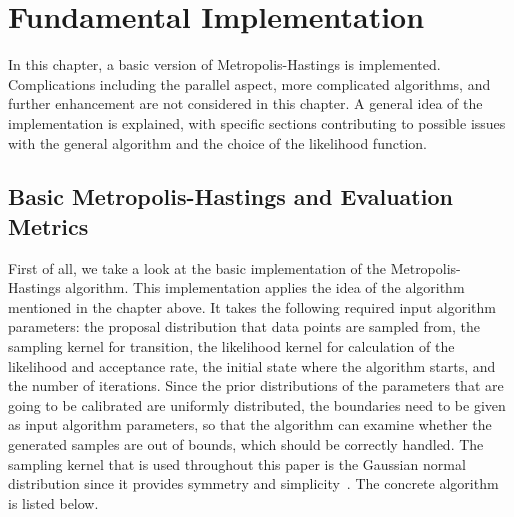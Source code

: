 \chapter{Fundamental Implementation}
In this chapter, a basic version of Metropolis-Hastings is implemented. Complications including the parallel aspect, more complicated algorithms, and further enhancement are not considered in this chapter. A general idea of the implementation is explained, with specific sections contributing to possible issues with the general algorithm and the choice of the likelihood function.
\raggedbottom
\section{Basic Metropolis-Hastings and Evaluation Metrics}
First of all, we take a look at the basic implementation of the Metropolis-Hastings algorithm. This implementation applies the idea of the algorithm mentioned in the chapter above. It takes the following required input algorithm parameters: the proposal distribution that data points are sampled from, the sampling kernel for transition, the likelihood kernel for calculation of the likelihood and acceptance rate, the initial state where the algorithm starts, and the number of iterations. Since the prior distributions of the parameters that are going to be calibrated are uniformly distributed, the boundaries need to be given as input algorithm parameters, so that the algorithm can examine whether the generated samples are out of bounds, which should be correctly handled. The sampling kernel that is used throughout this paper is the Gaussian normal distribution since it provides symmetry and simplicity~\cite{gaussian_distribution_property}. The concrete algorithm is listed below.
\raggedbottom

